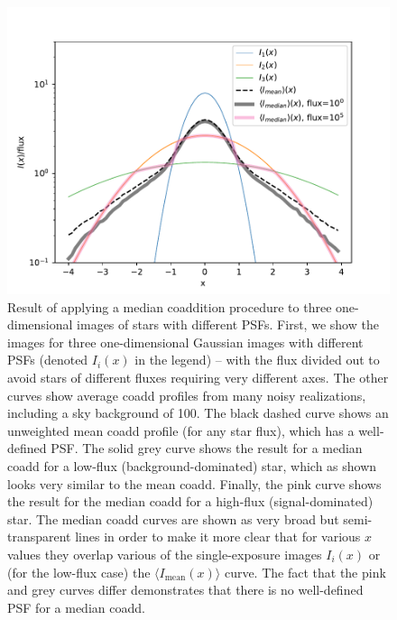 \documentclass{aastex63}
\newcommand{\irresponse}[1]{{#1}}
\begin{document}
\begin{figure}
\begin{center}
\includegraphics[width=5in]{figures/noisy_median_coadd_psf.pdf}
 \caption{Result of applying a median coaddition procedure to three one-dimensional images of stars with different PSFs. 
 First, we show the images for three one-dimensional Gaussian images with different PSFs (denoted $I_i(x)$ in the legend) -- with the flux divided out to avoid stars of different fluxes requiring very different axes.  The other curves show average coadd profiles from many noisy realizations, including a sky background of 100.  The black dashed curve shows an unweighted mean coadd profile (for any star flux), which has a well-defined PSF.  The solid \irresponse{grey} curve shows the result for a median coadd for a low-flux (background-dominated) star, which as shown looks very similar to the mean coadd.  Finally, the pink curve shows the result for the median coadd for a high-flux (signal-dominated) star.  \irresponse{The median coadd curves are shown as very broad but semi-transparent lines in order to make it more clear that for various $x$ values they overlap various of the single-exposure images $I_i(x)$ or (for the low-flux case) the $\langle I_\text{mean}(x)\rangle$ curve.}
 The fact that the pink and \irresponse{grey} curves differ demonstrates that there is no well-defined PSF for a median coadd.
 }
 \label{fig:median_coadd_psf}
\end{center}
 \end{figure}
\end{document}
